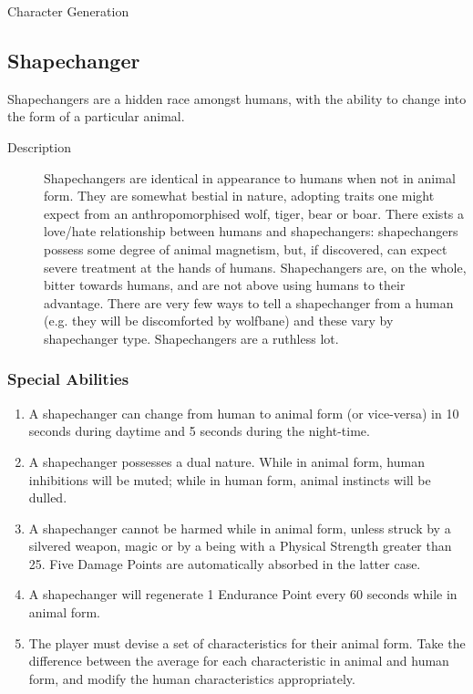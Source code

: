 \begin{Chapter}{Character Generation}
\subsection{Shapechanger}


Shapechangers are a hidden race amongst humans, with the ability to
change into the form of a particular animal.

\begin{description}
\item[Description] Shapechangers are identical in appearance to humans
  when not in animal form.  They are somewhat bestial in nature,
  adopting traits one might expect from an anthropomorphised wolf,
  tiger, bear or boar.  There exists a love/hate relationship between
  humans and shapechangers: shapechangers possess some degree of
  animal magnetism, but, if discovered, can expect severe treatment at
  the hands of humans.  Shapechangers are, on the whole, bitter
  towards humans, and are not above using humans to their advantage.
  There are very few ways to tell a shapechanger from a human (e.g.
  they will be discomforted by wolfbane) and these vary by
  shapechanger type.  Shapechangers are a ruthless lot.
\end{description}

\subsubsection{Special Abilities}

\begin{enumerate}

\item A shapechanger can change from human to animal form (or
  vice-versa) in 10 seconds during daytime and 5 seconds during the
  night-time.

\item A shapechanger possesses a dual nature.  While in animal form,
  human inhibitions will be muted; while in human form, animal
  instincts will be dulled.

\item A shapechanger cannot be harmed while in animal form, unless
  struck by a silvered weapon, magic or by a being with a Physical
  Strength greater than 25.  Five Damage Points are automatically
  absorbed in the latter case.

\item A shapechanger will regenerate 1 Endurance Point every 60
  seconds while in animal form.

\item The player must devise a set of characteristics for their animal
  form. Take the difference between the average for each
  characteristic in animal and human form, and modify the human
  characteristics appropriately.


\end{enumerate}
\end{Chapter}
